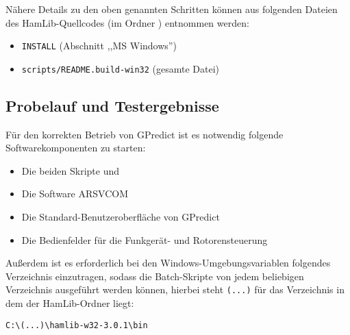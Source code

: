Nähere Details zu den oben genannten Schritten können aus folgenden Dateien des HamLib-Quellcodes (im Ordner ) entnommen werden:

\begin{itemize}
	\parskip0pt
	\item \texttt{INSTALL} (Abschnitt ,,MS Windows'')
	\item \texttt{scripts/README.build-win32} (gesamte Datei)
\end{itemize}

\subsection{Probelauf und Testergebnisse}
\label{chap:probelauf}

Für den korrekten Betrieb von GPredict ist es notwendig folgende Softwarekomponenten zu starten:

\begin{itemize}
	\parskip0pt
	\item Die beiden Skripte  und 
	\item Die Software ARSVCOM
	\item Die Standard-Benutzeroberfläche von GPredict
	\item Die Bedienfelder für die Funkgerät- und Rotorensteuerung
\end{itemize}

\newpage

Außerdem ist es erforderlich bei den Windows-Umgebungsvariablen folgendes Verzeichnis einzutragen, sodass die Batch-Skripte von jedem beliebigen Verzeichnis ausgeführt werden können, hierbei steht \texttt{(...)} für das Verzeichnis in dem der HamLib-Ordner liegt:

\vspace{-1em}
\begin{shaded}
	\verb!C:\(...)\hamlib-w32-3.0.1\bin!
\end{shaded}

